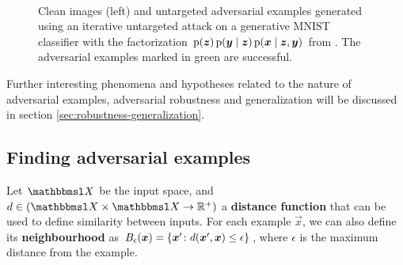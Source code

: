 \documentclass[twocolumn]{article}
\begin{document}
\begin{figure}
	\begin{center}
		\
	\end{center}
	\caption{Clean images (left) and untargeted adversarial examples generated using an iterative untargeted attack on a generative MNIST \citep{LeCun:2015:DL} classifier with the factorization $\p(\vec z)\p(\vec y\mid\vec z)\p(\vec x\mid\vec z,\vec y)$ from \citet{Li:2019:AGCMRAA}. The adversarial examples marked in green are successful.}
	\label{fig:li-gfz-adversarial-examples-mnist}
\end{figure}

Further interesting phenomena and hypotheses related to the nature of adversarial examples, adversarial robustness and generalization will be discussed in section \ref{sec:robustness-generalization}.


\subsection{Finding adversarial examples} \label{sec:finding-adversarial-examples}

Let $\set X$ be the input space,
and $d\in(\set X\times\set X\to \R^+)$ a \textbf{distance function} that can be used to define similarity between inputs. 
For each example $\vec x$, 
we can also define its \textbf{neighbourhood} as $B_{\epsilon}(\vec x) = \cbr{\vec x'\colon d(\vec x', \vec x) \leq \epsilon}$,
where $\epsilon$ is the maximum distance from the example.
\end{document}
